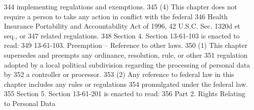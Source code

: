 344     implementing regulations and exemptions.
345          (4) This chapter does not require a person to take any action in conflict with the federal
346     Health Insurance Portability and Accountability Act of 1996, 42 U.S.C. Sec. 1320d et seq., or
347     related regulations.
348          Section 4. Section 13-61-103 is enacted to read:
349          13-61-103. Preemption -- Reference to other laws.
350          (1) This chapter supersedes and preempts any ordinance, resolution, rule, or other
351     regulation adopted by a local political subdivision regarding the processing of personal data by
352     a controller or processor.
353          (2) Any reference to federal law in this chapter includes any rules or regulations
354     promulgated under the federal law.
355          Section 5. Section 13-61-201 is enacted to read:
356     
Part 2. Rights Relating to Personal Data

